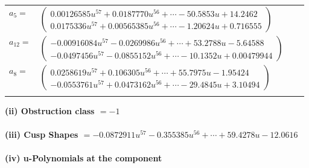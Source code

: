 \documentclass[1p]{elsarticle_modified}
\theoremstyle{definition}
\begin{document}
\begin{tabular}{m{7pt} m{180pt} m{7pt} m{180pt} }
\flushright $a_{5}=$&$\begin{pmatrix}0.00126585 u^{57}+0.0187770 u^{56}+\cdots-50.5853 u+14.2462\\0.0175336 u^{57}+0.00565385 u^{56}+\cdots-1.20624 u+0.716555\end{pmatrix}$ \\
\flushright $a_{12}=$&$\begin{pmatrix}-0.00916084 u^{57}-0.0269986 u^{56}+\cdots+53.2788 u-5.64588\\-0.0497456 u^{57}-0.0855152 u^{56}+\cdots-10.1352 u+0.00479944\end{pmatrix}$ \\
\flushright $a_{8}=$&$\begin{pmatrix}0.0258619 u^{57}+0.106305 u^{56}+\cdots+55.7975 u-1.95424\\-0.0553761 u^{57}+0.0473162 u^{56}+\cdots-29.4845 u+3.10494\end{pmatrix}$\\&\end{tabular}
\flushleft \textbf{(ii) Obstruction class $= -1$}\\~\\
\flushleft \textbf{(iii) Cusp Shapes $= -0.0872911 u^{57}-0.355385 u^{56}+\cdots+59.4278 u-12.0616$}\\~\\
\newpage\renewcommand{\arraystretch}{1}
\flushleft \textbf{(iv) u-Polynomials at the component}\newline \\
\end{document}
